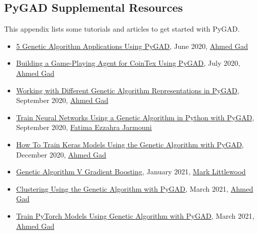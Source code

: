 \documentclass[conference]{IEEEtran}
\begin{document}
\begin{appendices}

\section{PyGAD Supplemental Resources}
\label{AppendixA}

This appendix lists some tutorials and articles to get started with PyGAD. 

\begin{itemize}
    \item \href{https://blog.paperspace.com/genetic-algorithm-applications-using-pygad}{5 Genetic Algorithm Applications Using PyGAD}, June 2020, \href{https://www.linkedin.com/in/ahmedfgad}{Ahmed Gad}
    \item \href{https://blog.paperspace.com/building-agent-for-cointex-using-genetic-algorithm}{Building a Game-Playing Agent for CoinTex Using PyGAD}, July 2020, \href{https://www.linkedin.com/in/ahmedfgad}{Ahmed Gad}
    \item \href{https://blog.paperspace.com/working-with-different-genetic-algorithm-representations-python}{Working with Different Genetic Algorithm Representations in PyGAD}, September 2020, \href{https://www.linkedin.com/in/ahmedfgad}{Ahmed Gad}
    \item \href{https://heartbeat.fritz.ai/train-neural-networks-using-a-genetic-algorithm-in-python-with-pygad-862905048429?gi=ba58ee6b4bbd}{Train Neural Networks Using a Genetic Algorithm in Python with PyGAD}, September 2020, \href{https://www.linkedin.com/in/fatima-ezzahra-jarmouni-341a6b167/}{Fatima Ezzahra Jarmouni}
    \item \href{https://blog.paperspace.com/train-keras-models-using-genetic-algorithm-with-pygad}{How To Train Keras Models Using the Genetic Algorithm with PyGAD}, December 2020, \href{https://www.linkedin.com/in/ahmedfgad}{Ahmed Gad}
    \item \href{https://markatsmartersig.wordpress.com/2021/01/04/genetic-algorithm-v-gradient-boosting}{Genetic Algorithm V Gradient Boosting}, January 2021, \href{http://www.smartersig.com/mysportsai.php}{Mark Littlewood}
    \item \href{https://blog.paperspace.com/clustering-using-the-genetic-algorithm}{Clustering Using the Genetic Algorithm with PyGAD}, March 2021, \href{https://www.linkedin.com/in/ahmedfgad}{Ahmed Gad}
    \item \href{https://neptune.ai/blog/train-pytorch-models-using-genetic-algorithm-with-pygad}{Train PyTorch Models Using Genetic Algorithm with PyGAD}, March 2021, \href{https://www.linkedin.com/in/ahmedfgad}{Ahmed Gad}

\end{itemize}
\end{appendices}
\end{document}
